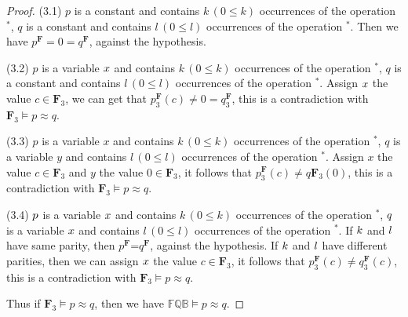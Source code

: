 \documentclass[10pt,a4paper]{amsart}
\begin{document}
\begin{proof}
(3.1) $p$ is a constant and contains $k \,(0\leq k)$ occurrences of the operation $^{*}$, $q$ is a constant and contains $l \, (0\leq l)$ occurrences of the operation $^{*}$. Then we have $p^\mathbf{F}=0=q^\mathbf{F}$, against the hypothesis.

(3.2) $p$ is a variable $\emph{x}$ and contains $k\,(0\leq k)$ occurrences of the operation $^{*}$, $q$ is a constant and contains $l\, (0\leq l)$ occurrences of the operation $^{*}$. Assign $\emph{x}$ the value $c\in \mathbf{F}_{3}$, we can get that $p^\mathbf{F}_{3}(c)\neq 0=q^\mathbf{F}_{3}$, this is a contradiction with
$\mathrm{\mathbf{F}_{3}}\models p\approx q$.

(3.3) $p$ is a variable $x$ and contains $k\,(0\leq k)$ occurrences of the operation $^{*}$, $q$ is a variable $y$ and contains $l\,(0\leq l)$ occurrences of the operation $^{*}$. Assign $x$ the value $c\in \mathbf{F}_{3}$ and $y$ the value $0\in \mathbf{F}_{3}$, it follows that $p^\mathbf{F}_{3}(c)\neq q\mathbf{F}_{3}(0)$, this is a contradiction with $\mathrm{\mathbf{F}_{3}}\models p\approx q$.

(3.4) $\emph{p}$ is a variable $\emph{x}$ and contains $k\,(0\leq k)$ occurrences of the operation $^{*}$, $\emph{q}$ is a variable $\emph{x}$ and contains $l\,(0\leq l)$ occurrences of the operation $^{*}$. If $\emph{k}$ and $\emph{l}$ have same parity, then $p^\mathbf{F}$=$q^\mathbf{F}$, against the hypothesis. If $\emph{k}$ and $\emph{l}$ have different parities, then we can assign $\emph{x}$ the value $c\in \mathbf{F}_{3}$, it follows that $p^\mathbf{F}_{3}(c)\neq q^\mathbf{F}_{3}(c)$, this is a contradiction with $\mathrm{\mathbf{F}_{3}}\models p\approx q$.

Thus if $\mathrm{\mathbf{F}_{3}}\models p\approx q$, then we have $\mathbb{FQB}\models p\approx q$.
\end{proof}
\end{document}
